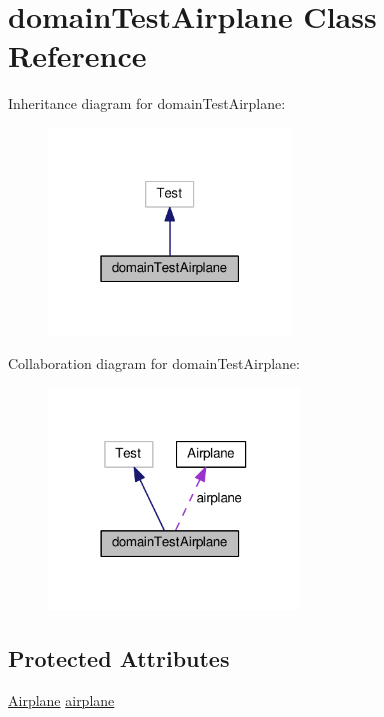 \hypertarget{classdomainTestAirplane}{}\section{domain\+Test\+Airplane Class Reference}
\label{classdomainTestAirplane}


Inheritance diagram for domain\+Test\+Airplane\+:
\nopagebreak
\begin{figure}[H]
\begin{center}
\leavevmode
\includegraphics[width=183pt]{classdomainTestAirplane__inherit__graph}
\end{center}
\end{figure}


Collaboration diagram for domain\+Test\+Airplane\+:
\nopagebreak
\begin{figure}[H]
\begin{center}
\leavevmode
\includegraphics[width=189pt]{classdomainTestAirplane__coll__graph}
\end{center}
\end{figure}
\subsection*{Protected Attributes}
\begin{DoxyCompactItemize}
\item 
\hyperlink{classAirplane}{Airplane} \hyperlink{classdomainTestAirplane_a5d07401cce1be605f6146628d7eb274b}{airplane}
\end{DoxyCompactItemize}


